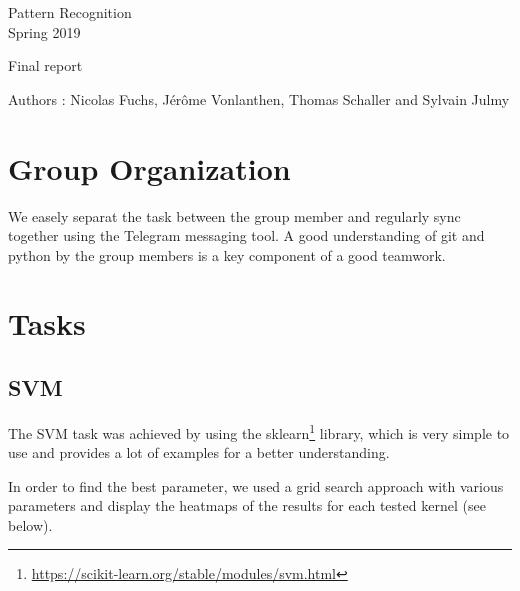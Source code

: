 \documentclass[a4paper,11pt]{report}
\date{\today}
\begin{document}
\begin{center}
  \large{
    Pattern Recognition\\
    Spring 2019
  }
  
  \noindent\makebox[\linewidth]{\rule{\linewidth}{0.4pt}}
  Final report
  \noindent\makebox[\linewidth]{\rule{\linewidth}{0.4pt}}

  \begin{flushleft}
    Authors : Nicolas Fuchs, Jérôme Vonlanthen, Thomas Schaller and Sylvain Julmy
  \end{flushleft}
  
  \noindent\makebox[\linewidth]{\rule{\textwidth}{1pt}}
\end{center}

\section*{Group Organization}

We easely separat the task between the group member and regularly sync together
using the Telegram messaging tool. A good understanding of git and python by the
group members is a key component of a good teamwork.

\section*{Tasks}

\subsection*{SVM}

The SVM task was achieved by using the
sklearn\footnote{\url{https://scikit-learn.org/stable/modules/svm.html}}
library, which is very simple to use and provides a lot of examples for a better
understanding.

In order to find the best parameter, we used a grid search approach with various
parameters and display the heatmaps of the results for each tested kernel (see below).
\end{document}
